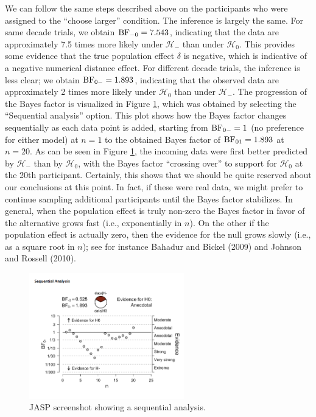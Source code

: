 \documentclass[english,,doc,floatsintext]{apa6}
\begin{document}
We can follow the same steps described above on the participants who were assigned to the \enquote{choose larger} condition. The inference is largely the same. For same decade trials, we obtain \(\textnormal{BF}_{-0}=7.543\), indicating that the data are approximately 7.5 times more likely under \(\mathcal{H}_{-}\) than under \(\mathcal{H}_{0}\). This provides some evidence that the true population effect \(\delta\) is negative, which is indicative of a negative numerical distance effect. For different decade trials, the inference is less clear; we obtain \(\textnormal{BF}_{0-}=1.893\), indicating that the observed data are approximately 2 times more likely under \(\mathcal{H}_{0}\) than under \(\mathcal{H}_{-}\). The progression of the Bayes factor is visualized in Figure \ref{fig:ttestSequential}, which was obtained by selecting the \enquote{Sequential analysis} option. This plot shows how the Bayes factor changes sequentially as each data point is added, starting from \(\textnormal{BF}_{0-}=1\) (no preference for either model) at \(n=1\) to the obtained Bayes factor of \(\textnormal{BF}_{01}=1.893\) at \(n=20\). As can be seen in Figure \ref{fig:ttestSequential}, the incoming data were first better predicted by \(\mathcal{H}_{-}\) than by \(\mathcal{H}_{0}\), with the Bayes factor \enquote{crossing over} to support for \(\mathcal{H}_{0}\) at the 20th participant. Certainly, this shows that we should be quite reserved about our conclusions at this point. In fact, if these were real data, we might prefer to continue sampling additional participants until the Bayes factor stabilizes. In general, when the population effect is truly non-zero the Bayes factor in favor of the alternative grows fast (i.e., exponentially in \(n\)). On the other if the population effect is actually zero, then the evidence for the null grows slowly (i.e., as a square root in \(n\)); see for instance Bahadur and Bickel (2009) and Johnson and Rossell (2010).

\begin{figure}
\centering
\includegraphics[width=0.6\textwidth,height=\textheight]{figures/ttestSequential.png}
\caption{\label{fig:ttestSequential}JASP screenshot showing a sequential analysis.}
\end{figure}
\end{document}

